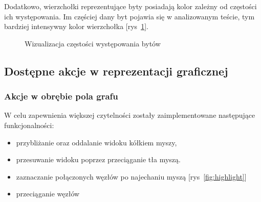 \documentclass[12pt,a4paper]{article} %
\begin{document}
            Dodatkowo, wierzchołki reprezentujące byty posiadają kolor zależny od częstości ich występowania. Im częściej dany byt pojawia się w analizowanym teście, tym bardziej intensywny kolor wierzchołka [rys~\ref{fig:nodes}].
            
            \begin{figure}[h]
            \caption{Wizualizacja częstości występowania bytów}
            \label{fig:nodes}
            \centering
            \end{figure}
            
    \subsection{Dostępne akcje w reprezentacji graficznej}
        \subsubsection{Akcje w obrębie pola grafu}
            W celu zapewnienia większej czytelności zostały zaimplementowane następujące funkcjonalności:
            \begin{itemize}
                \item przybliżanie oraz oddalanie widoku kółkiem myszy,
                \item przesuwanie widoku poprzez przeciąganie tła myszą.
                \item zaznaczanie połączonych węzłów po najechaniu myszą [rys~\ref{fig:highlight}]
                \item przeciąganie węzłów
            \end{itemize}
            
\end{document}
